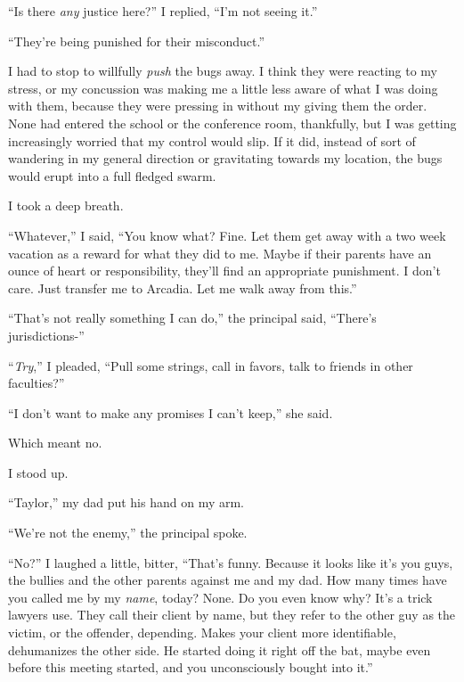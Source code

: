 ``Is there \emph{any }justice here?'' I replied, ``I'm not seeing it.''



``They're being punished for their misconduct.''



I had to stop to willfully \emph{push} the bugs away.  I think they were reacting to my stress, or my concussion was making me a little less aware of what I was doing with them, because they were pressing in without my giving them the order.  None had entered the school or the conference room, thankfully, but I was getting increasingly worried that my control would slip.  If it did, instead of sort of wandering in my general direction or gravitating towards my location, the bugs would erupt into a full fledged swarm.



I took a deep breath.



``Whatever,'' I said, ``You know what?  Fine.  Let them get away with a two week vacation as a reward for what they did to me.  Maybe if their parents have an ounce of heart or responsibility, they'll find an appropriate punishment.  I don't care.  Just transfer me to Arcadia.  Let me walk away from this.''



``That's not really something I can do,'' the principal said, ``There's jurisdictions-''



``\emph{Try},'' I pleaded, ``Pull some strings, call in favors, talk to friends in other faculties?''



``I don't want to make any promises I can't keep,'' she said.



Which meant no.



I stood up.



``Taylor,'' my dad put his hand on my arm.



``We're not the enemy,'' the principal spoke.



``No?'' I laughed a little, bitter, ``That's funny.  Because it looks like it's you guys, the bullies and the other parents against me and my dad.  How many times have you called me by my \emph{name}, today?  None.  Do you even know why?  It's a trick lawyers use.  They call their client by name, but they refer to the other guy as the victim, or the offender, depending.  Makes your client more identifiable, dehumanizes the other side.  He started doing it right off the bat, maybe even before this meeting started, and you unconsciously bought into it.''



